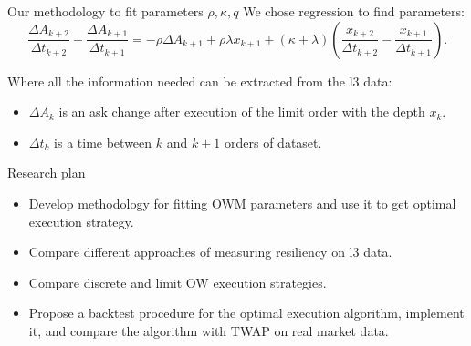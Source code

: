 \documentclass[aspectratio=169]{beamer}
\begin{document}
\begin{frame}{Our methodology to fit parameters $\rho, \kappa, q$}
    We chose regression to find parameters:                                                                                                                                                                                                                                                                                                                                                                                       
            \begin{equation*}
                \frac{\Delta A_{k+2}}{\Delta t_{k+2}} - \frac{\Delta A_{k+1}}{\Delta t_{k+1}} 
        = - \rho \Delta A_{k+1} + \rho \lambda x_{k+1} + (\kappa + \lambda) (\frac{x_{k+2}}{\Delta t_{k+2}} - \frac{x_{k+1}}{\Delta t_{k+1}}).
            \end{equation*}

        Where all the information needed can be extracted from the l3 data: 
        \begin{itemize}
            \item $\Delta A_{k}$ is an ask change after execution of the limit order with the depth $x_k$.
            \item $\Delta t_{k}$ is a time between $k$ and $k + 1$ orders of dataset.
        \end{itemize}
\end{frame}

\begin{frame}{Research plan}
    \begin{itemize}
        \item Develop methodology for fitting OWM parameters and use it to get optimal execution strategy. 
        \item Compare different approaches of measuring resiliency on l3 data.
        \item Compare discrete and limit OW execution strategies.
        \item Propose a backtest procedure for the optimal execution algorithm, implement it, and compare the algorithm with TWAP
        on real market data.
    \end{itemize}
\end{frame}
\end{document}

